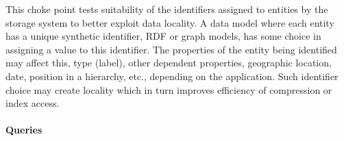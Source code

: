 
This choke point tests suitability of the identifiers assigned to entities by the storage system to better exploit data locality. A data model where each entity has a unique synthetic identifier,
\eg RDF or graph models, has some choice in assigning a value to this identifier.
The properties of the entity being identified may affect this, \eg type (label), other dependent properties,
\eg geographic location, date, position in a hierarchy, etc., depending on the application. Such identifier choice may create locality which in turn improves efficiency of compression or index access.


\paragraph{Queries}
{\raggedright

}